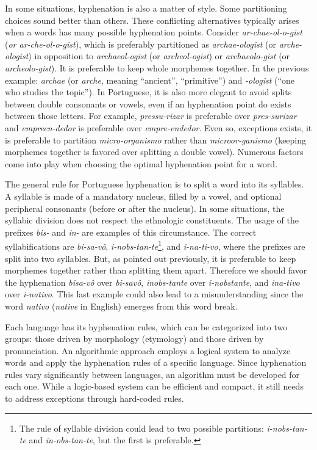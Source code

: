 In some situations, hyphenation is also a matter of style. Some partitioning
choices sound better than others. These conflicting alternatives typically
arises when a words has many possible hyphenation points. Consider
\emph{ar-chae-ol-o-gist} (\emph{or ar-che-ol-o-gist}), which is preferably partitioned as
\emph{archae-ologist} (or \emph{arche-ologist}) in opposition to \emph{archaeol-ogist} (or
\emph{archeol-ogist}) or \emph{archaeolo-gist} (or \emph{archeolo-gist}). It is preferable to keep
whole morphemes together. In the previous example: \emph{archae} (or \emph{arche}, meaning
``ancient'', ``primitive'')
and \emph{-ologist} (``one who studies the topic''). In Portuguese, it is also more
elegant to avoid splits between double consonants or vowels, even if an
hyphenation point do exists between those letters. For example,
\emph{pressu-rizar} is preferable over \emph{pres-surizar} and
\emph{empreen-dedor} is preferable over \emph{empre-endedor}. Even so,
exceptions exists, it is preferable to partition \emph{micro-organismo}
rather than \emph{microor-ganismo} (keeping morphemes together is favored
over splitting a double vowel). Numerous factors come into play when choosing
the optimal hyphenation point for a word.

The general rule for Portuguese hyphenation is to split a word into its
syllables. A syllable is made of a mandatory nucleus, filled by a vowel, and
optional peripheral consonants (before or after the nucleus). In some
situations, the syllabic division does not respect the ethnologic constituents.
The usage of the prefixes \emph{bis-} and \emph{in-} are examples of this
circumstance. The correct syllabifications are \emph{bi-sa-vô},
\emph{i-nobs-tan-te}\footnote{The rule of syllable
division could lead to two possible partitions: \emph{i-nobs-tan-te} and
\emph{in-obs-tan-te}, but the first is preferable.}, and \emph{i-na-ti-vo}, 
where the prefixes are split into two syllables. 
But, as pointed out previously, it is preferable to keep
morphemes together rather than splitting them apart. Therefore we should
favor the hyphenation \emph{bisa-vô} over \emph{bi-savô}, \emph{inobs-tante} 
over \emph{i-nobstante}, and \emph{ina-tivo} over \emph{i-nativo}. 
This last example could also lead to a misunderstanding
since the word \emph{nativo} (\emph{native} in English) emerges from this word
break. 

Each language has its hyphenation rules, which can be categorized into two
groups: those driven by morphology (etymology) and those driven by
pronunciation.  An algorithmic approach employs a logical system to analyze
words and apply the hyphenation rules of a specific language. Since hyphenation
rules vary significantly between languages, an algorithm must be
developed for each one. While a logic-based system can be efficient and
compact, it still needs to address exceptions through hard-coded rules.

